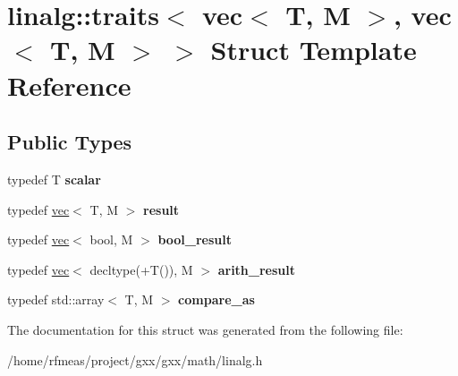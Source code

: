 \hypertarget{structlinalg_1_1traits_3_01vec_3_01T_00_01M_01_4_00_01vec_3_01T_00_01M_01_4_01_4}{}\section{linalg\+:\+:traits$<$ vec$<$ T, M $>$, vec$<$ T, M $>$ $>$ Struct Template Reference}
\label{structlinalg_1_1traits_3_01vec_3_01T_00_01M_01_4_00_01vec_3_01T_00_01M_01_4_01_4}
\subsection*{Public Types}
\begin{DoxyCompactItemize}
\item 
typedef T {\bfseries scalar}\hypertarget{structlinalg_1_1traits_3_01vec_3_01T_00_01M_01_4_00_01vec_3_01T_00_01M_01_4_01_4_a24e60fc701cb1cac8508297d02b644b7}{}\label{structlinalg_1_1traits_3_01vec_3_01T_00_01M_01_4_00_01vec_3_01T_00_01M_01_4_01_4_a24e60fc701cb1cac8508297d02b644b7}

\item 
typedef \hyperlink{structlinalg_1_1vec}{vec}$<$ T, M $>$ {\bfseries result}\hypertarget{structlinalg_1_1traits_3_01vec_3_01T_00_01M_01_4_00_01vec_3_01T_00_01M_01_4_01_4_a90a2a8d83d14f6cc73cf2cbe7888020d}{}\label{structlinalg_1_1traits_3_01vec_3_01T_00_01M_01_4_00_01vec_3_01T_00_01M_01_4_01_4_a90a2a8d83d14f6cc73cf2cbe7888020d}

\item 
typedef \hyperlink{structlinalg_1_1vec}{vec}$<$ bool, M $>$ {\bfseries bool\+\_\+result}\hypertarget{structlinalg_1_1traits_3_01vec_3_01T_00_01M_01_4_00_01vec_3_01T_00_01M_01_4_01_4_a5025c74a22ed57d15f84e1ec32b30f6c}{}\label{structlinalg_1_1traits_3_01vec_3_01T_00_01M_01_4_00_01vec_3_01T_00_01M_01_4_01_4_a5025c74a22ed57d15f84e1ec32b30f6c}

\item 
typedef \hyperlink{structlinalg_1_1vec}{vec}$<$ decltype(+T()), M $>$ {\bfseries arith\+\_\+result}\hypertarget{structlinalg_1_1traits_3_01vec_3_01T_00_01M_01_4_00_01vec_3_01T_00_01M_01_4_01_4_a480c0350a028ed7a8aa0a38dfb7d43e0}{}\label{structlinalg_1_1traits_3_01vec_3_01T_00_01M_01_4_00_01vec_3_01T_00_01M_01_4_01_4_a480c0350a028ed7a8aa0a38dfb7d43e0}

\item 
typedef std\+::array$<$ T, M $>$ {\bfseries compare\+\_\+as}\hypertarget{structlinalg_1_1traits_3_01vec_3_01T_00_01M_01_4_00_01vec_3_01T_00_01M_01_4_01_4_a0b454776f70ee7fc7912d4733777d834}{}\label{structlinalg_1_1traits_3_01vec_3_01T_00_01M_01_4_00_01vec_3_01T_00_01M_01_4_01_4_a0b454776f70ee7fc7912d4733777d834}

\end{DoxyCompactItemize}


The documentation for this struct was generated from the following file\+:\begin{DoxyCompactItemize}
\item 
/home/rfmeas/project/gxx/gxx/math/linalg.\+h\end{DoxyCompactItemize}
